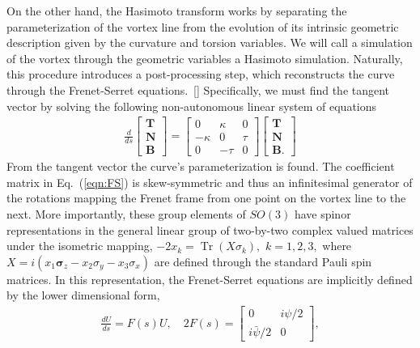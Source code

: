 \documentclass[aps,graphicx,reprint,onecolumn,12pt,tightenlines,longbibliography]{revtex4-1}
\DeclareMathOperator{\Tr}{Tr}
\newcommand{\sas}[2]{{#2}}
\begin{document}
On the other hand, the Hasimoto transform works by separating the parameterization of the vortex line from the evolution of its intrinsic geometric description given by the curvature and torsion variables. We will call a simulation of the vortex through the \sas{of the}{} geometric variables a {Hasimoto \sas{evolution/}{}simulation}. Naturally, this procedure introduces a post-processing step, which reconstructs the curve through the Frenet-Serret equations.~[] Specifically, we must find the tangent vector by solving the following non-autonomous linear system of equations 
%
\begin{align}\label{eqn:FS}
\frac{d}{ds}\begin{bmatrix}{\textbf{T}} \\ {\textbf{N}}\\ {\textbf{B}} \end{bmatrix}  = \begin{bmatrix} 0 & \kappa & 0 \\ -\kappa & 0 & \tau \\ 0 & -\tau  & 0 \end{bmatrix} \begin{bmatrix}{\textbf{T}} \\ {\textbf{N}}\\ {\textbf{B}}. \end{bmatrix} 
\end{align}
%
From the tangent vector the curve's parameterization is found. The coefficient matrix in Eq.~(\ref{eqn:FS}) is skew-symmetric and thus an infinitesimal generator of the rotations mapping the Frenet frame from one point on the vortex line to the next. More importantly, these group elements of $SO(3)$ have spinor representations in the general linear group of two-by-two complex valued matrices under the isometric mapping,  $-2 x_{k} =\Tr({X}{\sigma}_{k}),\, \,  k=1,2,3,$ where ${X} = i(x_{1} \mathbf{\sigma}_{z}-x_{2}{\sigma}_{y}-x_{3}{\sigma}_{x})$ are defined through the standard Pauli spin matrices. In this representation, the Frenet-Serret equations are implicitly defined by the lower dimensional form,
%
\begin{align}\label{eqn:FSSpinor}
 \frac{d{U}}{ds} = {F}(s) {U}, \quad 2{F}(s) = \begin{bmatrix} 0 & i\psi/2 \\ i \bar{\psi}/2 & 0 \end{bmatrix},
\end{align}
%
\end{document}
